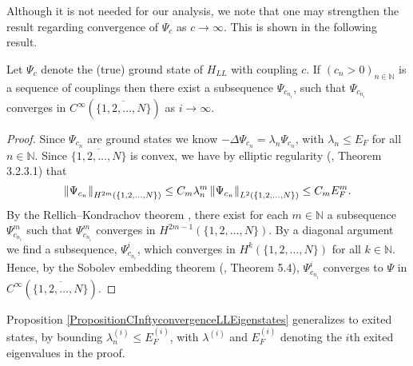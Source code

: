 Although it is not needed for our analysis, we note that one may strengthen the result regarding convergence of $\Psi_c$ as $c\to\infty$. This is shown in the following result.
\begin{proposition}\label{PropositionCInftyconvergenceLLEigenstates}
	Let $ \Psi_c $ denote the (true) ground state of $ H_{LL} $ with coupling $ c $. If $ (c_n>0)_{n\in\mathbb{N}} $ is a sequence of couplings then there exist a subsequence $ \Psi_{c_{n_i}} $, such that $ \Psi_{c_{n_i}} $ converges in $ C^{\infty}(\overline{\{1,2,\ldots,N\}}) $ as $ i\to\infty $.
\end{proposition}
\begin{proof}
	Since $ \Psi_{c_n} $ are ground states we know $ -\Delta\Psi_{c_n}=\lambda_n \Psi_{c_n} $, with $ \lambda_n\leq E_F $ for all $ n\in\mathbb{N} $. Since $ \overline{\{1,2,\ldots,N\}} $ is convex, we have by elliptic regularity (\cite{grisvard2011elliptic}, Theorem 3.2.3.1) that $$ \left\lVert \Psi_{c_n} \right\rVert_{H^{2m}(\{1,2,\ldots,N\})}\leq C_m \lambda_n^m \left\lVert \Psi_{c_n} \right\rVert_{L^2(\{1,2,\ldots,N\})}\leq C_m E_F^m. $$ 
	By the Rellich--Kondrachov theorem \cite{adams1975sobolev}, there exist for each $ m\in\mathbb{N} $ a subsequence $ \Psi^m_{c_{n_i}} $ such that $ \Psi^m_{c_{n_i}} $ converges in $ H^{2m-1}(\{1,2,\ldots,N\}) $. By a diagonal argument we find a subsequence, $ \Psi^i_{c_{n_i}} $, which converges in $ H^k(\{1,2,\ldots,N\}) $ for all $ k\in\mathbb{N} $. Hence, by the Sobolev embedding theorem (\cite{adams1975sobolev}, Theorem 5.4), $ \Psi^i_{c_{n_i}} $ converges to $ \Psi $ in $ C^\infty(\overline{\{1,2,\ldots,N\}}) $.
\end{proof}
Proposition \ref{PropositionCInftyconvergenceLLEigenstates} generalizes to exited states, by bounding $\lambda^{(i)}_n\leq E_F^{(i)}$, with $\lambda^{(i)}$ and $E_F^{(i)}$ denoting the $i$th exited eigenvalues in the proof.\\


